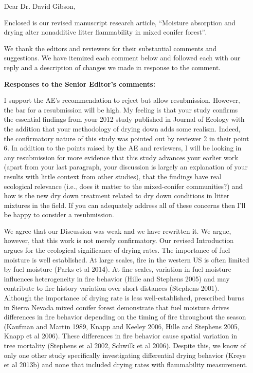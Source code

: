 \documentclass[letterpaper, 12pt]{letter}
\begin{document}
\begin{letter}{}

\opening{Dear Dr. David Gibson,}

Enclosed is our revised manuscript research article, ``Moisture absorption and drying alter nonadditive litter flammability in mixed conifer forest''.

We thank the editors and reviewers for their substantial comments and
suggestions. We have itemized each comment below and followed each with our
reply and a description of changes we made in response to the comment.

{\bf Responses to the Senior Editor's comments:}

\begin{quoting}
  I support the AE's recommendation to reject but allow resubmission. However,
  the bar for a resubmission will be high. My feeling is that your study
  confirms the essential findings from your 2012 study published in Journal of
  Ecology with the addition that your methodology of drying down adds some
  realism. Indeed, the confirmatory nature of this study was pointed out by
  reviewer 2 in their point 6. In addition to the points raised by the AE and
  reviewers, I will be looking in any resubmission for more evidence that this
  study advances your earlier work (apart from your last paragraph, your
  discussion is largely an explanation of your results with little context from
  other studies), that the findings have real ecological relevance (i.e., does
  it matter to the mixed-conifer communities?) and how is the new dry down
  treatment related to dry down conditions in litter mixtures in the field. If
  you can adequately address all of these concerns then I'll be happy to
  consider a resubmission.
\end{quoting}

We agree that our Discussion was weak and we have rewritten it. We argue,
however, that this work is not merely confirmatory. Our revised Introduction
argues for the ecological significance of drying rates. The importance of fuel
moisture is well established. At large scales, fire in the western US is often
limited by fuel moisture (Parks et al 2014). At fine scales, variation in fuel
moisture influences heterogeneity in fire behavior (Hille and Stephens 2005)
and may contribute to fire history variation over short distances (Stephens
2001). Although the importance of drying rate is less well-established,
prescribed burns in Sierra Nevada mixed conifer forest demonstrate that fuel
moisture drives differences in fire behavior depending on the timing of fire
throughout the season (Kaufman and Martin 1989, Knapp and Keeley 2006, Hille
and Stephens 2005, Knapp et al 2006). These differences in fire behavior cause
spatial variation in tree mortality (Stephens et al 2002, Schwilk et al 2006).
Despite this, we know of only one other study specifically investigating
differential drying behavior (Kreye et al 2013b) and none that included drying
rates with flammability measurement.


\end{letter}
\end{document}
